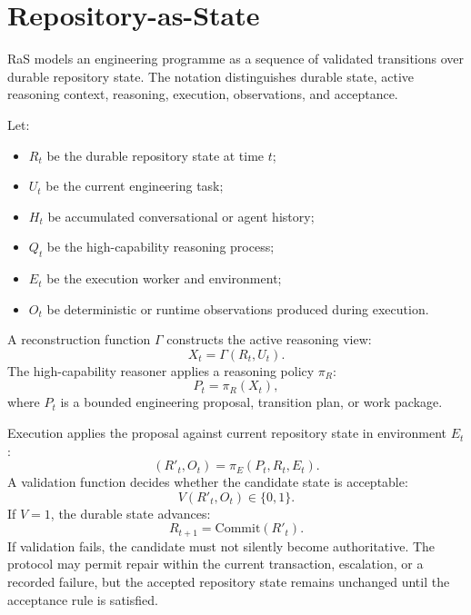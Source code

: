 \section{Repository-as-State}
\label{sec:ras}

RaS models an engineering programme as a sequence of validated transitions over durable repository state. The notation distinguishes durable state, active reasoning context, reasoning, execution, observations, and acceptance.

Let:
\begin{itemize}
    \item $R_t$ be the durable repository state at time $t$;
    \item $U_t$ be the current engineering task;
    \item $H_t$ be accumulated conversational or agent history;
    \item $Q_t$ be the high-capability reasoning process;
    \item $E_t$ be the execution worker and environment;
    \item $O_t$ be deterministic or runtime observations produced during execution.
\end{itemize}

A reconstruction function $\Gamma$ constructs the active reasoning view:
\begin{equation}
X_t = \Gamma(R_t,U_t).
\label{eq:gamma}
\end{equation}
The high-capability reasoner applies a reasoning policy $\pi_R$:
\begin{equation}
P_t = \pi_R(X_t),
\label{eq:reason}
\end{equation}
where $P_t$ is a bounded engineering proposal, transition plan, or work package.

Execution applies the proposal against current repository state in environment $E_t$:
\begin{equation}
(R'_t,O_t)=\pi_E(P_t,R_t,E_t).
\label{eq:execute}
\end{equation}
A validation function decides whether the candidate state is acceptable:
\begin{equation}
V(R'_t,O_t)\in\{0,1\}.
\label{eq:validate}
\end{equation}
If $V=1$, the durable state advances:
\begin{equation}
R_{t+1}=\mathrm{Commit}(R'_t).
\label{eq:commit}
\end{equation}
If validation fails, the candidate must not silently become authoritative. The protocol may permit repair within the current transaction, escalation, or a recorded failure, but the accepted repository state remains unchanged until the acceptance rule is satisfied.

